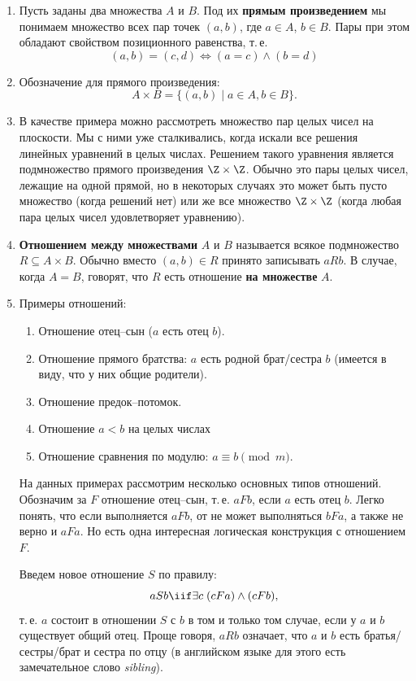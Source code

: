 \begin{enumerate}
\item Пусть заданы два множества $A$ и $B$. Под их \textbf{прямым произведением} мы понимаем множество всех пар точек $(a,b)$, где $a\in A$, $b\in B$. Пары при этом обладают свойством позиционного равенства, т.\,е.
\begin{equation}\label{pairdiff}
(a,b)=(c,d) \iff (a=c)\land (b=d)
\end{equation}

\item Обозначение для прямого произведения:
$$
A\times B = \{(a,b)\mid a\in A, b\in B\}.
$$
\item В качестве примера можно рассмотреть множество пар целых чисел на плоскости. Мы с ними уже сталкивались, когда искали все решения линейных уравнений в целых числах. Решением такого уравнения является подмножество прямого произведения $\Z\times\Z$. Обычно это пары целых чисел, лежащие на одной прямой, но в некоторых случаях это может быть пусто множество (когда решений нет) или же все множество $\Z\times\Z$ (когда любая пара целых чисел удовлетворяет уравнению).
\item \textbf{Отношением между множествами} $A$ и $B$ называется всякое подмножество $R\subseteq A\times B$. Обычно вместо $(a,b)\in R$ принято записывать $aRb$. В случае, когда $A=B$, говорят, что $R$ есть отношение \textbf{на множестве} $A$.
\item Примеры отношений:
\begin{enumerate}[\bf R1]
\item Отношение отец--сын ($a$ есть отец $b$).
\item Отношение прямого братства: $a$ есть родной брат/сестра $b$ (имеется в виду, что у них общие родители).
\item Отношение предок--потомок.
\item Отношение $a<b$ на целых числах
\item Отношение сравнения по модулю: $a\equiv b\pmod m$.
\end{enumerate}

На данных примерах рассмотрим несколько основных типов отношений. Обозначим за $F$ отношение отец--сын, т.\,е. $aFb$, если $a$ есть отец $b$. Легко понять, что если выполняется $aFb$, от не может выполняться $bFa$, а также не верно и $aFa$. Но есть одна интересная логическая конструкция с отношением $F$.

Введем новое отношение $S$ по правилу:
\begin{equation}\label{Bruder}
aSb \iif \exists c\;(cFa)\land(cFb),
\end{equation}
т.\,е. $a$ состоит в отношении $S$ с $b$ в том и только том случае, если у $a$ и $b$ существует общий отец. Проще говоря, $aRb$ означает, что $a$ и $b$ есть братья/сестры/брат и сестра по отцу (в английском языке для этого есть замечательное слово \textit{sibling}).


\end{enumerate}
